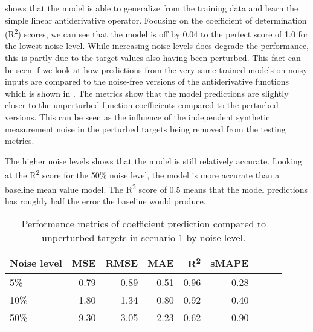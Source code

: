  shows that the model is able to generalize from the training data and learn the simple linear antiderivative operator. Focusing on the coefficient of determination (R\textsuperscript{2}) scores, we can see that the model is off by 0.04 to the perfect score of 1.0 for the lowest noise level. While increasing noise levels does degrade the performance, this is partly due to the target values also having been perturbed. This fact can be seen if we look at how predictions from the very same trained models on noisy inputs are compared to the noise-free versions of the antiderivative functions which is shown in . The metrics show that the model predictions are slightly closer to the unperturbed function coefficients compared to the perturbed versions. This can be seen as the influence of the independent synthetic measurement noise in the perturbed targets being removed from the testing metrics.

The higher noise levels shows that the model is still relatively accurate. Looking at the R\textsuperscript{2} score for the 50\% noise level, the model is more accurate than a baseline mean value model. The R\textsuperscript{2} score of 0.5 means that the model predictions has roughly half the error the baseline would produce.

\begin{table}[H]
  \caption{Performance metrics of coefficient prediction compared to unperturbed targets in scenario 1 by noise level.}\label{table:scenario_1_clean_spectral_metrics}
  \centering
  \begin{tabular}{lrrrrrrrr}
    \toprule
    Noise level & MSE  & RMSE & MAE  & R\textsuperscript{2} & sMAPE \\
    \midrule
    5\%         & 0.79 & 0.89 & 0.51 & 0.96                 & 0.28  \\
    10\%        & 1.80 & 1.34 & 0.80 & 0.92                 & 0.40  \\
    50\%        & 9.30 & 3.05 & 2.23 & 0.62                 & 0.90  \\
    \bottomrule
  \end{tabular}
\end{table}

